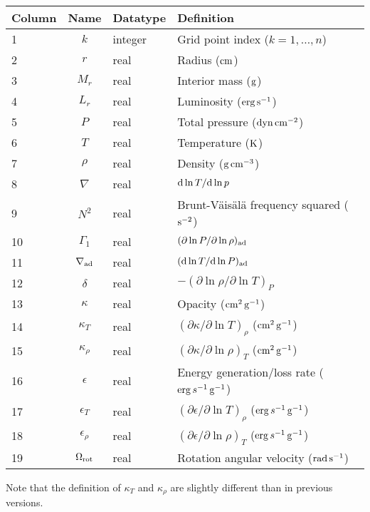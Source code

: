 \documentclass{article}
\newcommand{\diff}{\ensuremath{{\rm d}}}
\newcommand{\cm}{\ensuremath{{\rm cm}}}
\newcommand{\gram}{\ensuremath{{\rm g}}}
\newcommand{\second}{\ensuremath{{\rm s}}}
\newcommand{\dyne}{\ensuremath{{\rm dyn}}}
\newcommand{\erg}{\ensuremath{{\rm erg}}}
\newcommand{\kelvin}{\ensuremath{{\rm K}}}
\begin{document}
\begin{table}[h!]
\begin{tabular}{|l|c|l|l|} \hline
Column & Name & Datatype & Definition \\ \hline
1      & $k$ & integer & Grid point index ($k=1,\ldots,n$) \\
2      & $r$ & real    & Radius ($\cm$) \\
3      & $M_{r}$ & real  & Interior mass ($\gram$) \\
4      & $L_{r}$ & real & Luminosity ($\erg\,\second^{-1}$) \\
5      & $P$ & real    & Total pressure ($\dyne\,\cm^{-2}$) \\
6      & $T$ & real    & Temperature ($\kelvin$) \\
7      & $\rho$ & real & Density ($\gram\,\cm^{-3}$) \\
8      & $\nabla$ & real & $\diff \ln T/\diff \ln p$ \\
9      & $N^{2}$ & real & Brunt-V\"ais\"al\"a frequency squared ($\second^{-2}$) \\
10     & $\Gamma_{1}$ & real & $(\partial \ln P/\partial \ln \rho)_{\rm ad}$ \\
11     & $\nabla_{\rm ad}$ & real & $(\diff \ln T/\diff \ln P)_{\rm ad}$ \\
12     & $\delta$ & real & $-(\partial \ln \rho/\partial \ln T)_{P}$  \\
13     & $\kappa$ & real & Opacity ($\cm^{2}\,\gram^{-1}$) \\
14     & $\kappa_{T}$ & real & $(\partial \kappa/\partial \ln T)_{\rho}$ ($\cm^{2}\,\gram^{-1}$) \\
15     & $\kappa_{\rho}$ & real & $(\partial \kappa/\partial \ln \rho)_{T}$ ($\cm^{2}\,\gram^{-1}$) \\
16     & $\epsilon$ & real & Energy generation/loss rate ($\erg\,s^{-1}\,\gram^{-1}$) \\
17     & $\epsilon_{T}$ & real & $(\partial \epsilon/\partial \ln T)_{\rho}$ ($\erg\,s^{-1}\,\gram^{-1}$) \\
18     & $\epsilon_{\rho}$ & real & $(\partial \epsilon/\partial \ln \rho)_{T}$ ($\erg\,s^{-1}\,\gram^{-1}$) \\
19     & $\Omega_{\rm rot}$ & real & Rotation angular velocity (${\rm rad}\,\second^{-1}$) \\  \hline
\end{tabular}
\end{table}

Note that the definition of $\kappa_{T}$ and $\kappa_{\rho}$ are
slightly different than in previous versions.
\end{document}
